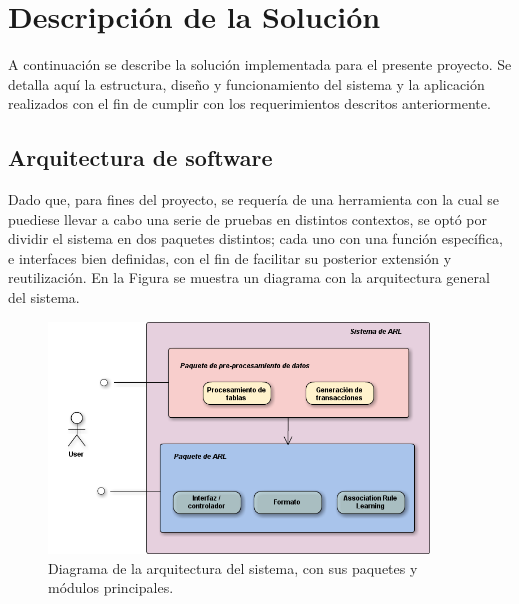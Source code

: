 \chapter{Descripción de la Solución}


A continuación se describe la solución implementada para el presente proyecto. Se detalla aquí la estructura, diseño y funcionamiento del sistema y la aplicación realizados con el fin de cumplir con los requerimientos descritos anteriormente.

\section{Arquitectura de software}

Dado que, para fines del proyecto, se requería de una herramienta con la cual se puediese llevar a cabo una serie de pruebas en distintos contextos, se optó por dividir el sistema en dos paquetes distintos; cada uno con una función específica, e interfaces bien definidas, con el fin de facilitar su posterior extensión y reutilización. En la Figura \label{fig:arq_sistema} se muestra un diagrama con la arquitectura general del sistema.

\begin{figure}[h!]
\begin{center}
\includegraphics[width=0.9\textwidth]{imagenes/arq_sistema.png}
\end{center}
\vspace*{-5mm}
\caption{Diagrama de la arquitectura del sistema, con sus paquetes y módulos principales.}
\label{fig:arq_sistema}
\end{figure}

